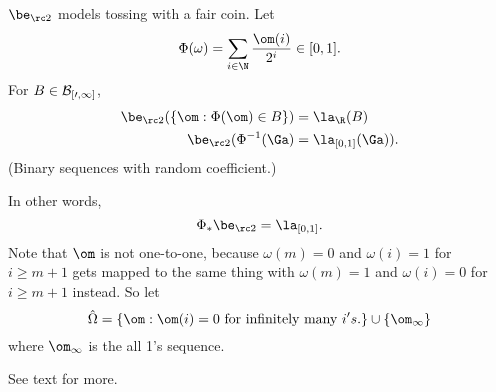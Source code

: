 $\be_{\rc 2}$ models tossing with a fair coin. Let
\[
\Phi(\omega)=\sum_{i\in \N} \frac{\om(i)}{2^i}\in [0,1].
\]
For $B\in \cal B_{[0,1]}$,
\begin{align*}
\be_{\rc 2}(\{\om:\Phi(\om)\in B\})
&=\la_{\R}(B)\\
\be_{\rc 2}(\Phi^{-1}(\Ga)&=\la_{[0,1]}(\Ga)).
\end{align*}
(Binary sequences with random coefficient.)

In other words, 
\[
\Phi_*\be_{\rc2}=\la_{[0,1]}.
\]
Note that $\om$ is not one-to-one, because $\omega(m)=0$ and $\omega(i)=1$ for $i\geq m+1$ gets mapped to the same thing with $\omega(m)=1$ and $\omega(i)=0$ for $i\geq m+1$ instead. So let
\[
\hat{\Omega}=\{\om:\om(i)=0\text{ for infinitely many }i{'s}.\}\cup \{\om_{\infty}\}
\]
where $\om_{\infty}$ is the all 1's sequence.

See text for more.